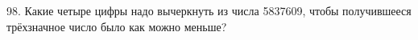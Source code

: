 98. Какие четыре цифры надо вычеркнуть из числа 5837609, чтобы получившееся трёхзначное число было как можно меньше?\\
